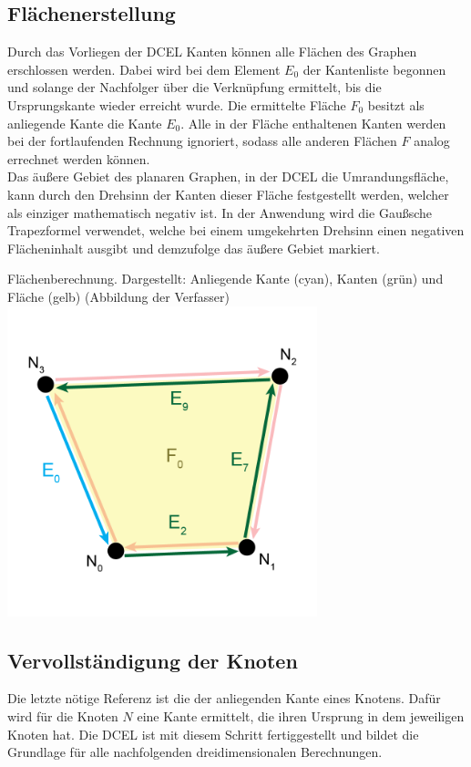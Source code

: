 \subsection{Flächenerstellung}
Durch das Vorliegen der DCEL Kanten können alle Flächen des Graphen erschlossen werden.
Dabei wird bei dem Element $E_0$ der Kantenliste begonnen und solange der Nachfolger über die Verknüpfung ermittelt, bis die Ursprungskante wieder erreicht wurde.
Die ermittelte Fläche $F_0$ besitzt als anliegende Kante die Kante $E_0$.
Alle in der Fläche enthaltenen Kanten werden bei der fortlaufenden Rechnung ignoriert, sodass alle anderen Flächen $F$ analog errechnet werden können. \\
Das äußere Gebiet des planaren Graphen, in der DCEL die Umrandungsfläche, kann durch den Drehsinn der Kanten dieser Fläche festgestellt werden, welcher als einziger mathematisch negativ ist.
In der Anwendung wird die Gaußsche Trapezformel verwendet, welche bei einem umgekehrten Drehsinn einen negativen Flächeninhalt ausgibt und demzufolge das äußere Gebiet markiert.

\begin{Bild}{Flächenberechnung. Dargestellt: Anliegende Kante (cyan), Kanten (grün) und Fläche (gelb) (Abbildung der Verfasser)}
	\includegraphics[width = 90mm]{Bilder/FlaecheBerechnung}
\end{Bild}

\subsection{Vervollständigung der Knoten}
Die letzte nötige Referenz ist die der anliegenden Kante eines Knotens.
Dafür wird für die Knoten $N$ eine Kante ermittelt, die ihren Ursprung in dem jeweiligen Knoten hat.
Die DCEL ist mit diesem Schritt fertiggestellt und bildet die Grundlage für alle nachfolgenden dreidimensionalen Berechnungen.\label{key}
